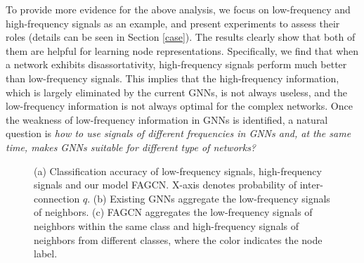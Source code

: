 \documentclass[letterpaper]{article} %
\begin{document}
To provide more evidence for the above analysis, we focus on low-frequency and high-frequency signals as an example, and present experiments to assess their roles (details can be seen in Section \ref{case}). 
The results clearly show that both of them are helpful for learning node representations. Specifically, we find that when a network exhibits disassortativity, high-frequency signals perform much better than low-frequency signals.
This implies that the high-frequency information, which is largely eliminated by the current GNNs, is not always useless, and the low-frequency information is not always optimal for the complex networks.
Once the weakness of low-frequency information in GNNs is identified, a natural question is \emph{how to use signals of different frequencies in GNNs and, at the same time, makes GNNs suitable for different type of networks?}

\begin{figure}
\centering
{}
\caption{(a) Classification accuracy of low-frequency signals, high-frequency signals and our model FAGCN. X-axis denotes probability of inter-connection $q$. (b) Existing GNNs aggregate the low-frequency signals of neighbors. (c) FAGCN aggregates the low-frequency signals of neighbors within the same class and high-frequency signals of neighbors from different classes, where the color indicates the node label.}
\label{intro}
\end{figure}
\end{document}

